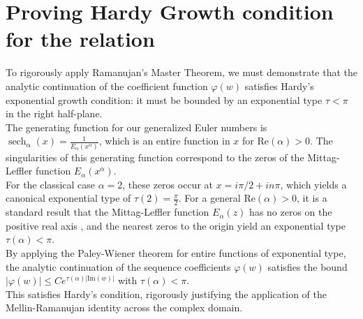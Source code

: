 \documentclass{article}
\DeclareMathOperator{\sech}{sech}
\newcommand{\NotDefinedsech}[2]{\operatorname{\sech_{#1}\text{#2}}}
\begin{document}
\section{Proving Hardy Growth condition for the relation}
To rigorously apply Ramanujan's Master Theorem, we must demonstrate that the analytic continuation of the coefficient function $\varphi(w)$ satisfies Hardy’s exponential growth condition: it must be bounded by an exponential type $\tau < \pi$ in the right half-plane.\\
The generating function for our generalized Euler numbers is $\NotDefinedsech{\alpha}{}(x) = \frac{1}{E_\alpha(x^\alpha)}$, which is an entire function in $x$ for Re$(\alpha) > 0$. The singularities of this generating function correspond to the zeros of the Mittag-Leffler function $E_\alpha(x^\alpha)$.\\
For the classical case $\alpha = 2$, these zeros occur at $x = i\pi/2 + in\pi$, which yields a canonical exponential type of $\tau(2) = \frac{\pi}{2}$. For a general Re$(\alpha) > 0$, it is a standard result that the Mittag-Leffler function $E_\alpha(z)$ has no zeros on the positive real axis \cite{Gorenflo2014}, and the nearest zeros to the origin yield an exponential type $\tau(\alpha) < \pi$.\\
By applying the Paley-Wiener theorem for entire functions of exponential type, the analytic continuation of the sequence coefficients $\varphi(w)$ satisfies the bound $|\varphi(w)| \le C e^{\tau(\alpha)|\text{Im}(w)|}$ with $\tau(\alpha) < \pi$.\\
This satisfies Hardy's condition, rigorously justifying the application of the Mellin-Ramanujan identity across the complex domain.


\end{document}
